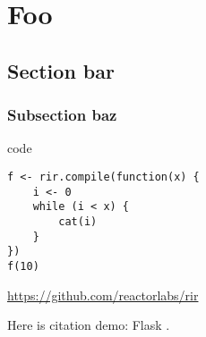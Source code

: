 \chapter{Foo \label{foo}}

\blind[2]

\section{Section bar}\label{bar}

\blind[2]

\subsection{Subsection baz}\label{baz}

\blind[2]

\begin{listing}[htbp]
\caption{\label{xxx}code}
\begin{verbatim}
f <- rir.compile(function(x) {
    i <- 0
    while (i < x) {
        cat(i)
    }
})
f(10)
\end{verbatim}
\end{listing}

\url{https://github.com/reactorlabs/rir}

Here is citation demo: Flask \autocite{flask}.

